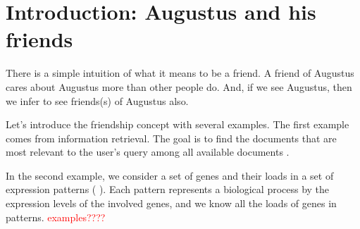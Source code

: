 \documentclass{llncs}
\begin{document}
\begin{abstract}

\textcolor{green}{We define a tag's most friendly collection as a collection that pays maximal rank-normalized attention to the tag.}
\textcolor{blue}{ -- we will return here --} \textcolor{purple}{
Suppose we have a set of {\tag}s and a set of fuzzy set of {\tag}s, which we will refer to as {\collection}s, and we have the {\tag}-to-{\collection} relation quantified as a scalar for each $\left( {\tag},{\collection}\right)$ pair. An example is: {\tag}s are genes, {\collection}s are gene expression patterns, and the scalars are loads of the genes in the patterns. Sometimes, an observation that a gene is expressed implies the expression of a particular pattern (the simplest case is: the gene has nonzero load only in that pattern). If so, we say that the gene marks the pattern. Here we describe a statistical test that identifies pairs of a marker {\tag} and the marked {\collection}. The test is based on rank statistics and it does not rely on propositions about the distribution of the relation quantity. The marked {\collection} is referred to as the {\tag}'s best friend, and the test is named "the best friends test" or "the gene's best friends test". The statistics naturally expand to the case when a {\tag} selects (separates) a subset of {\collection}s, thus having more than one best friend. The code (currently, only R) is available at \url{https://github.com/favorov/best-friends}
}
\end{abstract}
%
\section{Introduction: Augustus and his friends}

There is a simple intuition of what it means to be a friend. A friend of Augustus cares about Augustus more than other people do. And, if we see Augustus, then we infer to see friends(s) of Augustus also. 

Let's introduce the friendship concept with several examples.
The first example comes from information retrieval. The goal is to find the documents that are most relevant to the user's query among all available documents \cite{liu2009learning}. 

In the second example, we consider a set of genes and their loads in a set of expression patterns ( \cite{fertig_cogaps_2010,Fertig_2016,stein-obrien_enter_2018}). Each pattern represents a biological process by the expression levels of the involved genes, and we know all the loads of genes in patterns. \textcolor{red}{examples????}
\end{document}
